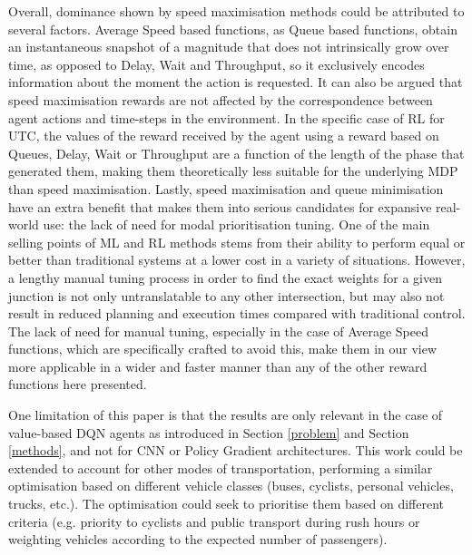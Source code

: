 \documentclass[a4paper, conference]{IEEEtran}
\begin{document}
Overall, dominance shown by speed maximisation methods could be attributed to several factors.
Average Speed based functions, as Queue based functions, obtain an instantaneous snapshot of a magnitude that does not intrinsically grow over time, as opposed to Delay, Wait and Throughput, so it exclusively encodes information about the moment the action is requested.
It can also be argued that speed maximisation rewards are not affected by the correspondence between agent actions and time-steps in the environment. In the specific case of RL for UTC, the values of the reward received by the agent using a reward based on Queues, Delay, Wait or Throughput are a function of the length of the phase that generated them, making them theoretically less suitable for the underlying MDP than speed maximisation.
Lastly, speed maximisation and queue minimisation have an extra benefit that makes them into serious candidates for expansive real-world use: the lack of need for modal prioritisation tuning.
One of the main selling points of ML and RL methods stems from their ability to perform equal or better than traditional systems at a lower cost in a variety of situations.
However, a lengthy manual tuning process in order to find the exact weights for a given junction is not only untranslatable to any other intersection, but may also not result in reduced planning and execution times compared with traditional control.
The lack of need for manual tuning, especially in the case of Average Speed functions, which are specifically crafted to avoid this, make them in our view more applicable in a wider and faster manner than any of the other reward functions here presented.

One limitation of this paper is that the results are only relevant in the case of value-based DQN agents as introduced in Section \ref{problem} and Section \ref{methods}, and not for CNN or Policy Gradient architectures.
This work could be extended to account for other modes of transportation, performing a similar optimisation based on different vehicle classes (buses, cyclists, personal vehicles, trucks, etc.). The optimisation could seek to prioritise them based on different criteria (e.g. priority to cyclists and public transport during rush hours or weighting vehicles according to the expected number of passengers).

%
\end{document}
